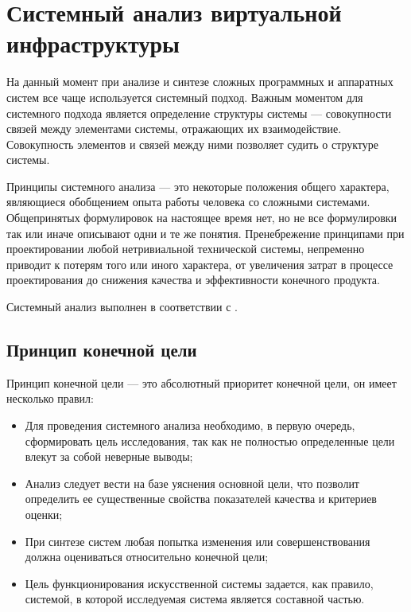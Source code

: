 \section{Системный анализ виртуальной инфраструктуры}

На данный момент при анализе и синтезе сложных программных и аппаратных систем все чаще используется системный подход.
Важным моментом для системного подхода является определение структуры системы --- совокупности связей между элементами системы, отражающих их взаимодействие.
Совокупность элементов и связей между ними позволяет судить о структуре системы.

Принципы системного анализа --- это некоторые положения общего характера, являющиеся обобщением опыта работы человека со сложными системами.
Общепринятых формулировок на настоящее время нет, но не все формулировки так или иначе описывают одни и те же понятия.
Пренебрежение принципами при проектировании любой нетривиальной технической системы, непременно приводит к потерям того или иного характера, от увеличения затрат в процессе проектирования до снижения качества и эффективности конечного продукта.

Системный анализ выполнен в соответствии с \cite{sys-analyz}.

\subsection{Принцип конечной цели}

Принцип конечной цели --- это абсолютный приоритет конечной цели, он имеет несколько правил:
\begin{itemize}
  \item Для проведения системного анализа необходимо, в первую очередь, сформировать цель исследования, так как не полностью определенные цели влекут за собой неверные выводы;
  \item Анализ следует вести на базе уяснения основной цели, что позволит определить ее существенные свойства показателей качества и критериев оценки;
  \item При синтезе систем любая попытка изменения или совершенствования должна оцениваться относительно конечной цели;
  \item Цель функционирования искусственной системы задается, как правило, системой, в которой исследуемая система является составной частью.
\end{itemize}

